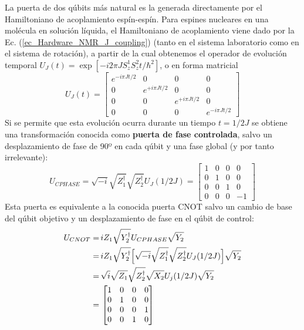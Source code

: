 \documentclass[a4paper,11pt]{book} %
\numberwithin{equation}{chapter}
\def\lc{\left[}
\def\rc{\right]}
\def\Lc{\Bigl[}
\def\Rc{\Bigr]}
\begin{document}
La puerta de dos qúbits más natural es la generada directamente por el Hamiltoniano de acoplamiento espín-espín. Para espines nucleares en una molécula en solución líquida, el Hamiltoniano de acoplamiento viene dado por la Ec. (\ref{ec_Hardware_NMR_J_coupling})  (tanto en el sistema  laboratorio como en el sistema de rotación), a partir de la cual obtenemos el operador de evolución temporal $U_J(t) = \exp \lc - i 2\pi J S_z^1 S_z^2 t /\hbar^2 \rc$, o en forma matricial
	\begin{equation} \label{ec_Hardware_NMR_UJ}
	U_J (t) = 
	\begin{bmatrix}
	e^{-i \pi Jt/2} & 0 & 0 & 0 \\
	0 & e^{+i \pi Jt/2} & 0 & 0 \\
	0 & 0 & e^{+i \pi Jt/2} & 0 \\
	0 & 0 & 0 & e^{-i \pi Jt/2}
	\end{bmatrix}
	\end{equation}
Si se permite que esta evolución ocurra durante un tiempo $t = 1/2J$ se obtiene una transformación conocida como \textbf{puerta de fase controlada}, salvo un desplazamiento de fase de 90º en cada qúbit y una fase global (y por tanto irrelevante):
	\begin{equation}
	U_{CPHASE} = \sqrt{-i} \sqrt{Z^\dagger_1} \sqrt{Z^\dagger_2} U_J (1/2J) = 
	\begin{bmatrix}
	1 & 0 & 0  & 0 \\
	0 & 1 & 0  & 0 \\
	0 & 0 & 1 & 0 \\
	0 & 0 & 0  & -1 
	\end{bmatrix}	 
	\end{equation}
Esta puerta es equivalente a la conocida puerta CNOT salvo un cambio de base del qúbit objetivo y un desplazamiento de fase en el qúbit de control:
	\begin{equation} \label{ec_Hardware_NMR_implementacion_CNOT}
\begin{aligned} 
	U_{CNOT} = & \, i Z_1 \sqrt{Y^\dagger_2} U_{CPHASE} \sqrt{Y_2} \nonumber \\
	= & \, i Z_1 \sqrt{Y^\dagger_2} \Lc \sqrt{-i} \sqrt{Z^\dagger_1} \sqrt{Z^\dagger_2} U_J (1/2J)  \Rc \sqrt{Y_2} \nonumber \\
	= & \, \sqrt{i} \sqrt{Z_1} \sqrt{Z_2^\dagger} \sqrt{X_2} U_j (1/2J) \sqrt{Y_2}  \nonumber \\
	= & \, 
	\begin{bmatrix}
	1 & 0 & 0  & 0 \\
	0 & 1 & 0  & 0 \\
	0 & 0 & 0 & 1 \\
	0 & 0 & 1  & 0 
	\end{bmatrix}
	\end{aligned}
\end{equation}
\end{document}
